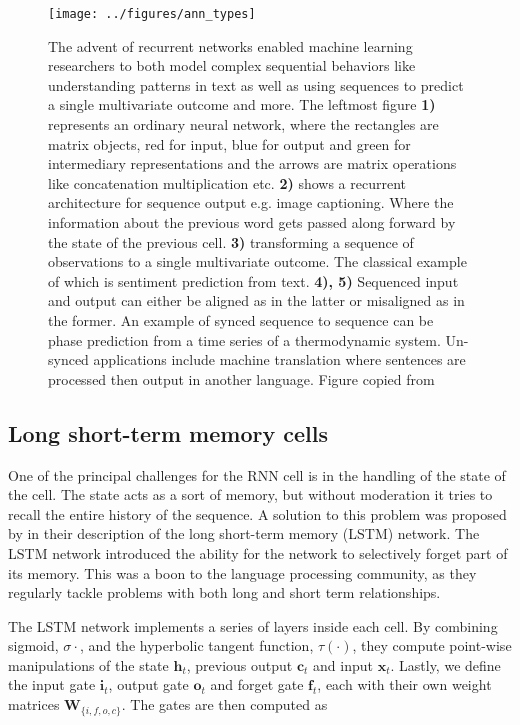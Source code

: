 \begin{figure}
\centering
\texttt{[image: ../figures/ann\_types]}
\caption[Archetypes of recurrent neural architectures]{The advent of recurrent networks enabled machine learning researchers to both model complex sequential behaviors like understanding patterns in text as well as using sequences to predict a single multivariate outcome and more. The leftmost figure \textbf{1)} represents an ordinary neural network, where the rectangles are matrix objects, red for input, blue for output and green for intermediary representations and the arrows are matrix operations like concatenation multiplication etc. \textbf{2)} shows a recurrent architecture for sequence output e.g. image captioning. Where the information about the previous word gets passed along forward by the state of the previous cell. \textbf{3)} transforming a sequence of observations to a single multivariate outcome. The classical example of which is sentiment prediction from text. \textbf{4), 5)} Sequenced input and output can either be aligned as in the latter or misaligned as in the former. An example of synced sequence to sequence can be phase prediction from a time series of a thermodynamic system. Un-synced applications include machine translation where sentences are processed then output in another language. Figure copied from \cite{Karpathy2015}}\label{fig:ann_architectures}
\end{figure}

\subsection{Long short-term memory cells}\label{sec:lstm}

One of the principal challenges for the RNN cell is in the handling of the state of the cell. The state acts as a sort of memory, but without moderation it tries to recall the entire history of the sequence. A solution to this problem was proposed by \cite{Hochreiter1997} in their description of the long short-term memory (LSTM) network. The LSTM network introduced the ability for the network to selectively forget part of its memory. This was a boon to the language processing community, as they regularly tackle problems with both long and short term relationships. 

The LSTM network implements a series of layers inside each cell. By combining sigmoid, $\sigma{\cdot}$, and the hyperbolic tangent function, $\tau(\cdot)$, they compute point-wise manipulations of the state $\mathbf{h}_t$, previous output $\mathbf{c}_t$ and input $\mathbf{x}_t$. Lastly, we define the input gate $\mathbf{i}_t$, output gate $\mathbf{o}_t$ and forget gate $\mathbf{f}_t$, each with their own weight matrices $\mathbf{W}_{\{i, f, o, c\}}$. The gates are then computed as

